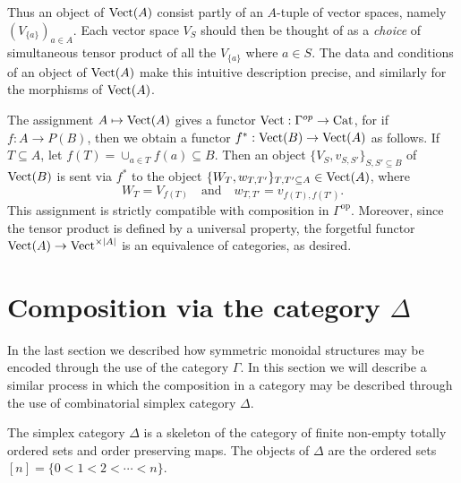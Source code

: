 \documentclass{amsart}
\begin{document}
Thus an object of $\mathrm{Vect}(A)$ consist partly of an $A$-tuple of vector spaces, namely $ (V_{\{a\}})_{a \in A}$. Each vector space $V_S$ should then be thought of as a {\em choice} of simultaneous tensor product of all the $V_{\{a\}}$ where $a \in S$. The data and conditions of an object of $\mathrm{Vect}(A)$ make this intuitive description precise, and similarly for the morphisms of $\mathrm{Vect}(A)$. 

The assignment $A \mapsto \mathrm{Vect}(A)$ gives a functor $\mathrm{Vect}: \Gamma^{op} \to \mathrm{Cat}$, for if $f: A \to P(B)$, then we obtain a functor $f^*: \mathrm{Vect}(B) \to \mathrm{Vect}(A)$ as follows. If $T \subseteq A$, let $f(T) = \cup_{a \in T} f(a) \subseteq B$. Then an object $\{ V_S, v_{S,S'} \}_{S, S' \subseteq B}$ of $\mathrm{Vect}(B)$ is sent via $f^*$ to the object $\{ W_T, w_{T, T'} \}_{T, T' \subseteq A} \in \mathrm{Vect}(A)$, where 
\begin{equation*}
	W_T = V_{f(T)} \quad \textrm{and} \quad  w_{T, T'} = v_{f(T), f(T')}.
\end{equation*}
This assignment is strictly compatible with composition in $\Gamma^\text{op}$. Moreover, since the tensor product is defined by a universal property, the forgetful functor $\mathrm{Vect}(A) \to \mathrm{Vect}^{\times |A|}$ is an equivalence of categories, as desired.  

\section{Composition via the category $\Delta$} \label{sec-Compdelta}



In the last section we described how symmetric monoidal structures may be encoded through the use of the category $\Gamma$. In this section we will describe a similar process in which the composition in a category may be described through the use of combinatorial simplex category $\Delta$. 

\begin{definition}
	The simplex category $\Delta$ is a skeleton of the category of finite non-empty totally ordered sets and order preserving maps. The objects of $\Delta$ are the ordered sets $[n] = \{ 0 < 1 < 2 < \cdots < n\}$. 
\end{definition}
\end{document}
